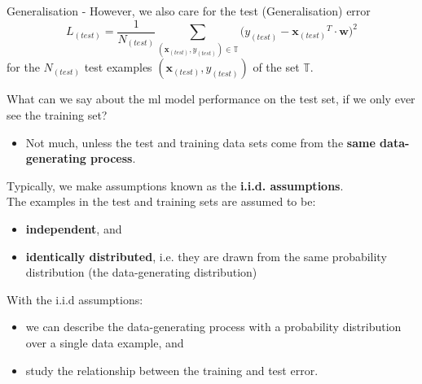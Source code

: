 \begin{frame}[t,allowframebreaks]{Generalisation -}
    However, we also care for the test (Generalisation) error
    \begin{equation}
        L_{(test)} = \frac{1}{N_{(test)}} 
        \sum_{({\mathbf x_{(test)}},y_{(test)})  \in \mathbb{T}}
        \Big( y_{(test)} - {\mathbf x_{(test)}}^T \cdot {\mathbf w} \Big)^2
    \end{equation}        
    for the $N_{(test)}$ test examples $({\mathbf x_{(test)}},y_{(test)})$ 
    of the set $\mathbb{T}$.

    \framebreak


    What can we say about the \gls{ml} model performance on the test set,
    if we only ever see the training set?
    \begin{itemize}
        \item
        Not much, unless the test and training data sets come from the 
        {\bf same data-generating process}.    
    \end{itemize}
    \vspace{0.2cm}   
    Typically, we make assumptions known as the {\bf i.i.d. assumptions}.\\
    \vspace{0.2cm}
    The examples in the test and training sets are assumed to be:
    \begin{itemize}
        \item {\bf independent}, and
        \item {\bf identically distributed}, 
        i.e. they are drawn from the same probability distribution 
        (the data-generating distribution)
    \end{itemize}
    \vspace{0.2cm}
    With the i.i.d assumptions:
    \begin{itemize}
        \item
        we can describe the data-generating process
        with a probability distribution over a single data example, and
        \item
        study the relationship between the training and test error.
    \end{itemize}

\end{frame}
